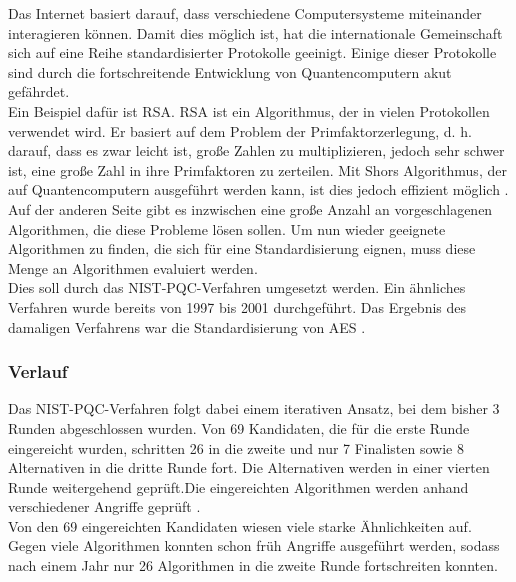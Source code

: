 			Das Internet basiert darauf, dass verschiedene Computersysteme miteinander interagieren können.
			Damit dies möglich ist, hat die internationale Gemeinschaft sich auf eine Reihe standardisierter Protokolle geeinigt.
			Einige dieser Protokolle sind durch die fortschreitende Entwicklung von Quantencomputern akut gefährdet.\\

			Ein Beispiel dafür ist RSA. RSA ist ein Algorithmus, der in vielen Protokollen verwendet wird.
			Er basiert auf dem Problem der Primfaktorzerlegung, d. h. darauf, dass es zwar leicht ist, große Zahlen zu multiplizieren, jedoch sehr schwer ist, eine große Zahl in ihre Primfaktoren zu zerteilen.
			Mit Shors Algorithmus, der auf Quantencomputern ausgeführt werden kann, ist dies jedoch effizient möglich \cite{Nist2016}.\\

			Auf der anderen Seite gibt es inzwischen eine große Anzahl an vorgeschlagenen Algorithmen, die diese Probleme lösen sollen.
			Um nun wieder geeignete Algorithmen zu finden, die sich für eine Standardisierung eignen, muss diese Menge an Algorithmen evaluiert werden.\\

			Dies soll durch das NIST-PQC-Verfahren umgesetzt werden.
			Ein ähnliches Verfahren wurde bereits von 1997 bis 2001 durchgeführt.
			Das Ergebnis des damaligen Verfahrens war die Standardisierung von AES \cite{Schneier2000}.\\
				
		\subsubsection{Verlauf}
		\label{subsubsec:grundlagen:pqc:verfahren:verlauf}

		Das NIST-PQC-Verfahren folgt dabei einem iterativen Ansatz, bei dem bisher 		3 Runden abgeschlossen wurden. Von 69 Kandidaten, die für die erste Runde 			eingereicht wurden, schritten 26 in die zweite und nur 7 Finalisten sowie 			8 Alternativen in die dritte Runde fort. Die Alternativen werden in einer 			vierten Runde weitergehend geprüft.Die eingereichten Algorithmen werden 				anhand verschiedener Angriffe geprüft \cite{Turner2022}.\\
		
		Von den 69 eingereichten Kandidaten wiesen viele starke Ähnlichkeiten auf. Gegen viele 			Algorithmen konnten schon früh Angriffe ausgeführt werden, sodass nach einem Jahr nur 26 		Algorithmen in die zweite Runde fortschreiten konnten.\\
		
